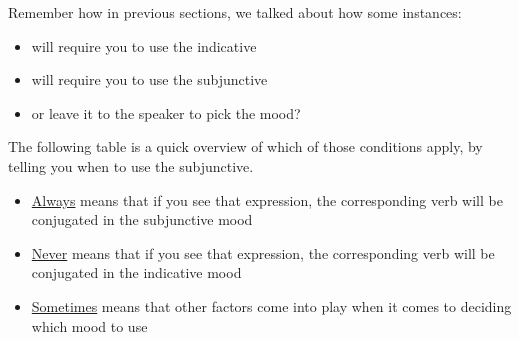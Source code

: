 Remember how in previous sections, we talked about how some instances:
\begin{itemize}
	\item will require you to use the indicative
	\item will require you to use the subjunctive
	\item or leave it to the speaker to pick the mood?
\end{itemize}

The following table is a quick overview of which of those conditions apply, by telling you when to use the subjunctive. \\

\begin{itemize}
	\item \underline{Always} means that if you see that expression, the corresponding verb will be conjugated in the subjunctive mood
	\item \underline{Never} means that if you see that expression, the corresponding verb will be conjugated in the indicative mood
	\item \underline{Sometimes} means that other factors come into play when it comes to deciding which mood to use
\end{itemize}

